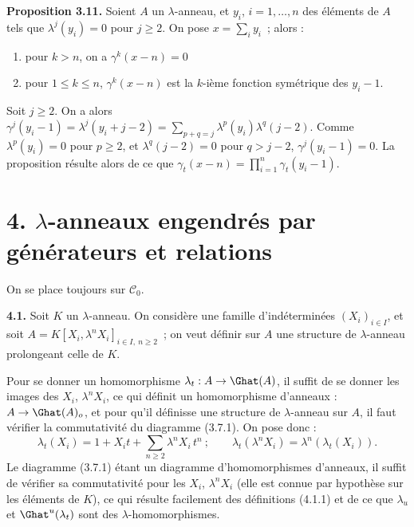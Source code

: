 \textbf{Proposition 3.11.} Soient \(A\) un \(\lambda\)-anneau, et \(y_i\), \(i=1,\dots,n\) des éléments de \(A\) tels que \(\lambda^j(y_i)=0\) pour \(j\ge2\). On pose \(x=\sum_i y_i\)~; alors :
\begin{enumerate}[label=\roman*)]
\item pour \(k>n\), on a \(\gamma^k(x-n)=0\)
\item pour \(1\le k\le n\), \(\gamma^k(x-n)\) est la \(k\)-ième fonction symétrique des \(y_i-1\).
\end{enumerate}
Soit \(j\ge2\). On a alors \(\gamma^j(y_i-1)=\lambda^j(y_i+j-2)=\sum_{p+q=j}\lambda^p(y_i)\lambda^q(j-2)\). Comme \(\lambda^p(y_i)=0\) pour \(p\ge2\), et \(\lambda^q(j-2)=0\) pour \(q>j-2\), \(\gamma^j(y_i-1)=0\). La proposition résulte alors de ce que \(\gamma_t(x-n)=\prod_{i=1}^{n}\gamma_t(y_i-1)\).

\section*{4. \(\lambda\)-anneaux engendrés par générateurs et relations}

On se place toujours sur \(\mathcal C_0\).

\textbf{4.1.} Soit \(K\) un \(\lambda\)-anneau. On considère une famille d'indéterminées \((X_i)_{i\in I}\), et soit \(A=K[X_i,\lambda^n X_i]_{i\in I,\ n\ge2}\)~; on veut définir sur \(A\) une structure de \(\lambda\)-anneau prolongeant celle de \(K\).

Pour se donner un homomorphisme \(\lambda_t:A\to\Ghat(A)\), il suffit de se donner les images des \(X_i\), \(\lambda^n X_i\), ce qui définit un homomorphisme d'anneaux : \(A\to\Ghat(A)_o\), et pour qu'il définisse une structure de \(\lambda\)-anneau sur \(A\), il faut vérifier la commutativité du diagramme (3.7.1). On pose donc :
\begin{equation}\tag{4.1.1}
  \lambda_t(X_i)=1+X_it+\sum_{n\ge2}\lambda^n X_i\,t^n~;
  \qquad
  \lambda_t(\lambda^n X_i)=\lambda^n(\lambda_t(X_i)).
\end{equation}
Le diagramme (3.7.1) étant un diagramme d'homomorphismes d'anneaux, il suffit de vérifier sa commutativité pour les \(X_i\), \(\lambda^n X_i\) (elle est connue par hypothèse sur les éléments de \(K\)), ce qui résulte facilement des définitions (4.1.1) et de ce que \(\lambda_u\) et \(\Ghat^u(\lambda_t)\) sont des \(\lambda\)-homomorphismes.


